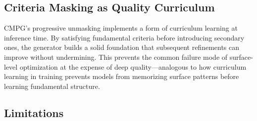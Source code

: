 \documentclass[11pt]{article}
\newcommand{\cmpg}{\textsc{CMPG}}
\begin{document}
\subsection{Criteria Masking as Quality Curriculum}

\cmpg{}'s progressive unmasking implements a form of curriculum learning \citep{bengio2009curriculum} at inference time. By satisfying fundamental criteria before introducing secondary ones, the generator builds a solid foundation that subsequent refinements can improve without undermining. This prevents the common failure mode of surface-level optimization at the expense of deep quality---analogous to how curriculum learning in training prevents models from memorizing surface patterns before learning fundamental structure.

\subsection{Limitations}
\end{document}
